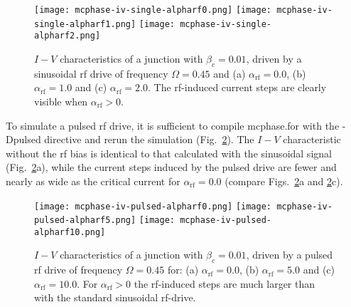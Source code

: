 \begin{figure}[bh]
{
	\fboxsep=0pt
	\mbox{\texttt{[image: mcphase-iv-single-alpharf0.png]}}
	\hfill
	\mbox{\texttt{[image: mcphase-iv-single-alpharf1.png]}}
	\hfill
	\mbox{\texttt{[image: mcphase-iv-single-alpharf2.png]}}
}
	\caption{$I - V$ characteristics of a junction with $\beta_c = 0.01$, driven by a sinusoidal rf drive of frequency $\Omega = 0.45$ and (a) $\alpha_\mathrm{rf} = 0.0$, (b) $\alpha_\mathrm{rf} = 1.0$ and (c) $\alpha_\mathrm{rf} = 2.0$. The rf-induced current steps are clearly visible when $\alpha_\mathrm{rf} > 0$.}
	\label{fig:mcphase-iv-single}
\end{figure}


To simulate a pulsed rf drive, it is sufficient to compile \textsf{mcphase.for} with the \textsf{-Dpulsed} directive and rerun the simulation (Fig.~\ref{fig:mcphase-iv-pulsed}). 
The $I - V$ characteristic without the rf bias is identical to that calculated with the sinusoidal signal (Fig.~\ref{fig:mcphase-iv-pulsed}a), while the current steps induced by the pulsed drive are fewer and nearly as wide as the critical current for $\alpha_\mathrm{rf} = 0.0$ (compare Figs.~\ref{fig:mcphase-iv-pulsed}a and \ref{fig:mcphase-iv-pulsed}c).


\begin{figure}[bh]
{
	\fboxsep=0pt
	\mbox{\texttt{[image: mcphase-iv-pulsed-alpharf0.png]}}
	\hfill
	\mbox{\texttt{[image: mcphase-iv-pulsed-alpharf5.png]}}
	\hfill
	\mbox{\texttt{[image: mcphase-iv-pulsed-alpharf10.png]}}
}
	\caption{$I - V$ characteristics of a junction with $\beta_c = 0.01$, driven by a pulsed rf drive of frequency $\Omega = 0.45$ for: (a) $\alpha_\mathrm{rf} = 0.0$, (b) $\alpha_\mathrm{rf} = 5.0$ and (c) $\alpha_\mathrm{rf} = 10.0$. For $\alpha_\mathrm{rf} > 0$ the rf-induced steps are much larger than with the standard sinusoidal rf-drive.}
	\label{fig:mcphase-iv-pulsed}
\end{figure}


